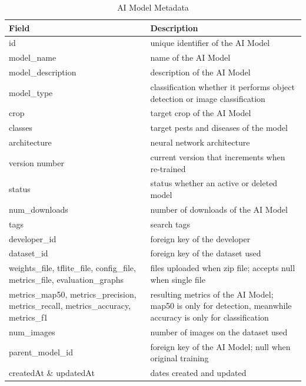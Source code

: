 \documentclass{icsthesis}
\begin{document}
\begin{mainmatter}
            \begin{table}[htbp]
                \centering
                \caption{AI Model Metadata}
                \label{tab:ai_model_metadata}
                \begin{tabular}{p{} p{}}
                    \toprule
                    \textbf{Field}          & \textbf{Description} \\ 
                    \midrule
                    id                      & unique identifier of the AI Model \\ 
                    model\_name             & name of the AI Model \\ 
                    model\_description      & description of the AI Model \\ 
                    model\_type             & classification whether it performs object detection or image classification \\ 
                    crop                    & target crop of the AI Model \\ 
                    classes                 & target pests and diseases of the model\\
                    architecture            & neural network architecture \\ 
                    version number          & current version that increments when re-trained \\ 
                    status                  & status whether an active or deleted model \\ 
                    num\_downloads          & number of downloads of the AI Model \\ 
                    tags                    & search tags  \\ 
                    developer\_id           & foreign key of the developer \\ 
                    dataset\_id             & foreign key of the dataset used \\ 
                    weights\_file, tflite\_file, config\_file, metrics\_file, evaluation\_graphs 
                                            & files uploaded when zip file; accepts null when single file \\ 
                    metrics\_map50, metrics\_precision, metrics\_recall, metrics\_accuracy, metrics\_f1 & resulting metrics of the AI Model; map50 is only for detection, meanwhile accuracy is only for classification \\ 
                    num\_images             & number of images on the dataset used \\ 
                    parent\_model\_id       & foreign key of the AI Model; null when original training \\ 
                    createdAt \& updatedAt  & dates created and updated \\
                    \bottomrule
                \end{tabular}
            \end{table}
            

\end{mainmatter}
\end{document}
